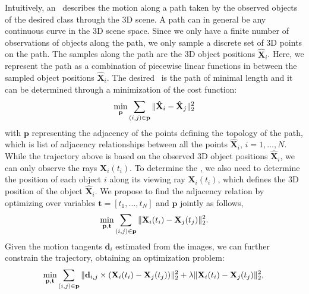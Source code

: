 Intuitively, an \oct~describes the motion along a path taken by the observed objects of the desired class through the 3D scene. A path can in general be any continuous curve in the 3D scene space. Since we only have a finite number of observations of objects along the path, we only sample a discrete set of 3D points on the path. The samples along the path are the 3D object positions $\mathbf{\hat{X}}_i$. Here, we represent the path as a combination of  piecewise linear functions in between the sampled object positions $\mathbf{\hat{X}}_i$.
The desired \oct~is the path of minimal length and it can be determined through a minimization of the cost function:
\begin{equation}
\label{eq:pathsimple}
\underset{\mathbf{p}} { \min  }\sum_{(i,j)\in\mathbf{p}}{\|\mathbf{\hat{X}}_i-\mathbf{\hat{X}}_j\|_2^2} \\
\end{equation}
with $\mathbf{p}$ representing the adjacency of the points defining the topology of the path, which is list of adjacency relationships between all the points $\mathbf{\hat{X}}_i$, $i=1, \dots, N$. While the trajectory above is based on the observed 3D object positions $\mathbf{\hat{X}}_i$, we can only observe the rays $\mathbf{X}_i(t_i)$. To determine the \oct, we also need to determine the position of each object $i$ along its viewing ray $\mathbf{X}_i(t_i)$, which defines the 3D position of the object $\mathbf{\hat{X}}_i$.
We propose to find the adjacency relation by optimizing over variables $\mathbf{t}=[ t_1, \dots, t_N ]$ and $\mathbf{p}$ jointly as follows,
\begin{equation}
\label{eq:pathsimpleray}
\underset{\mathbf{p},\mathbf{t}} { \text{min} }\sum_{(i,j)\in\mathbf{p}}{\|\mathbf{X}_i(t_i)-\mathbf{X}_j(t_j)\|_2^2}. \\
\end{equation}
Given the motion tangents $\mathbf d_i$ estimated from the images, we can further constrain the trajectory, obtaining an optimization problem:
\begin{equation}
\label{equ:costFunc}
\underset{\mathbf{p},\mathbf{t}} { \text{min} }
\sum_{(i,j)\in\mathbf{p}}{\|\mathbf{d}_{i,j}\times(\mathbf{X}_i(t_i)-\mathbf{X}_j(t_j))\|_2^2 + \lambda\|\mathbf{X}_i(t_i)-\mathbf{X}_j(t_j)\|_2^2}, \\
\end{equation}
